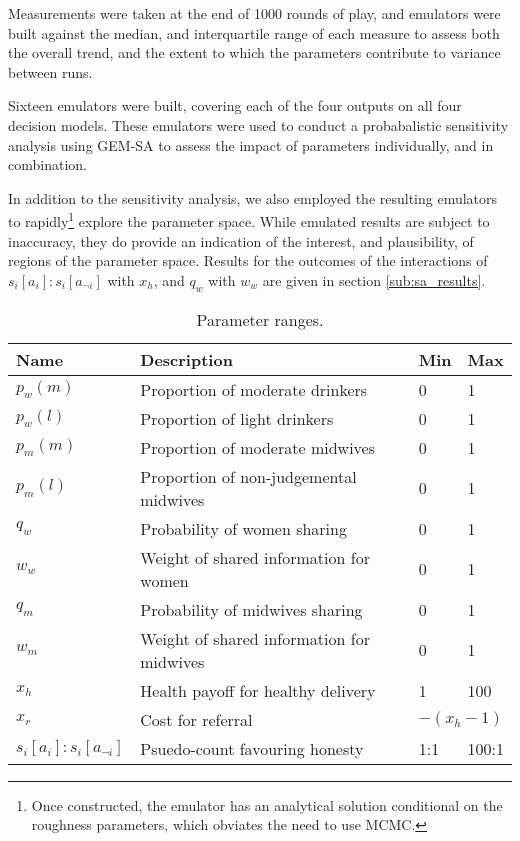 Measurements were taken at the end of 1000 rounds of play, and emulators were built against the median, and interquartile range of each measure to assess both the overall trend, and the extent to which the parameters contribute to variance between runs.

Sixteen emulators were built, covering each of the four outputs on all four decision models. These emulators were used to conduct a probabalistic sensitivity analysis using \ac{GEM-SA} to assess the impact of parameters individually, and in combination.

In addition to the sensitivity analysis, we also employed the resulting emulators to rapidly\footnote{Once constructed, the emulator has an analytical solution conditional on the roughness parameters, which obviates the need to use MCMC.} explore the parameter space. While emulated results are subject to inaccuracy, they do provide an indication of the interest, and plausibility, of regions of the parameter space. Results for the outcomes of the interactions of \(s_{i}[a_{i}]:s_{i}[a_{\neg i}]\) with \(x_{h}\), and \(q_{w}\) with \(w_{w}\) are given in section \ref{sub:sa_results}.

\begin{table}
\center
\begin{tabular} {|l | l | l| l|}
\hline
Name & Description & Min & Max \\ \hline
\(p_{w}(m)\) & Proportion of moderate drinkers & 0 & 1 \\ \hline
\(p_{w}(l)\) & Proportion of light drinkers & 0 & 1 \\ \hline
\(p_{m}(m)\) & Proportion of moderate midwives & 0 & 1 \\ \hline
\(p_{m}(l)\) & Proportion of non-judgemental midwives & 0 & 1 \\ \hline
\(q_{w}\) & Probability of women sharing & 0 & 1 \\ \hline
\(w_{w}\) & Weight of shared information for women & 0 & 1 \\ \hline
\(q_{m}\) & Probability of midwives sharing & 0 & 1 \\ \hline
\(w_{m}\) & Weight of shared information for midwives & 0 & 1 \\ \hline
\(x_{h}\) & Health payoff for healthy delivery & 1 & 100 \\ \hline
\(x_{r}\) & Cost for referral & \multicolumn{2}{l|}{\(-(x_{h} - 1)\)} \\ \hline
\(s_{i}[a_{i}]:s_{i}[a_{\neg i}]\) & Psuedo-count favouring honesty & 1:1 & 100:1 \\ \hline
\end{tabular}
\caption[Table caption text]{Parameter ranges. \label{tab:sa_params}}
\end{table}